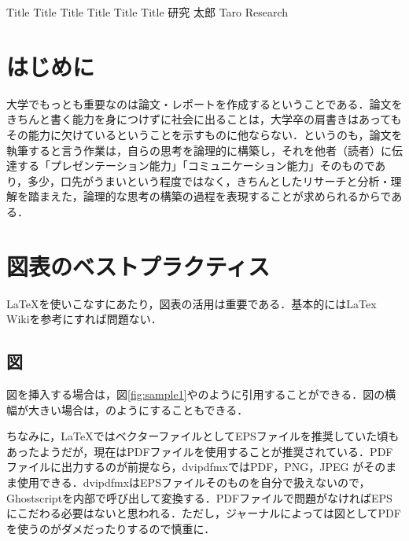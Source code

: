 \documentclass[a4paper,10pt,twocolumn,uplatex]{jsarticle}
\date{1}
\begin{document}
{Title Title Title Title Title Title}
{研究 太郎}
{Taro Research}

\section{はじめに}
大学でもっとも重要なのは論文・レポートを作成するということである．論文をきちんと書く能力を身につけずに社会に出ることは，大学卒の肩書きはあってもその能力に欠けているということを示すものに他ならない．というのも，論文を執筆すると言う作業は，自らの思考を論理的に構築し，それを他者（読者）に伝達する「プレゼンテーション能力」「コミュニケーション能力」そのものであり，多少，口先がうまいという程度ではなく，きちんとしたリサーチと分析・理解を踏まえた，論理的な思考の構築の過程を表現することが求められるからである．

\section{図表のベストプラクティス}
\LaTeX{}を使いこなすにあたり，図表の活用は重要である．基本的にはLaTex Wiki\cite{LaTexWiki}を参考にすれば問題ない．\par

\subsection{図}
図を挿入する場合は，図\ref{fig:sample1}やのように引用することができる．図の横幅が大きい場合は，のようにすることもできる．\par
ちなみに，\LaTeX{}ではベクターファイルとしてEPSファイルを推奨していた頃もあったようだが，現在はPDFファイルを使用することが推奨されている．PDFファイルに出力するのが前提なら，dvipdfmxではPDF，PNG，JPEG がそのまま使用できる．dvipdfmxはEPSファイルそのものを自分で扱えないので，Ghostscriptを内部で呼び出して変換する．PDFファイルで問題がなければEPSにこだわる必要はないと思われる．ただし，ジャーナルによっては図としてPDFを使うのがダメだったりするので慎重に．
\end{document}
